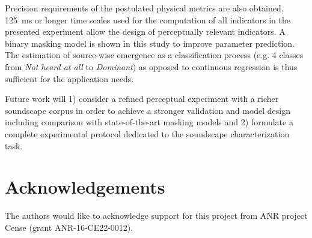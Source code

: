 \documentclass{article}
\begin{document}
\begin{sloppy}
Precision requirements of the postulated physical metrics are also obtained. 125~ms or longer time scales used for the computation of all indicators in the presented experiment allow the design of perceptually relevant indicators. A binary masking model is shown in this study to improve parameter prediction. The estimation of source-wise emergence as a classification process (e.g. 4 classes from \textit{Not heard at all} to \textit{Dominant}) as opposed to continuous regression is thus sufficient for the application needs.

Future work will 1) consider a refined perceptual experiment with a richer soundscape corpus in order to achieve a stronger validation and model design including comparison with state-of-the-art masking models and 2) formulate a complete experimental protocol dedicated to the soundscape characterization task.

\section{Acknowledgements}

The authors would like to acknowledge support for this project from ANR project Cense (grant ANR-16-CE22-0012).




\end{sloppy}
\end{document}
